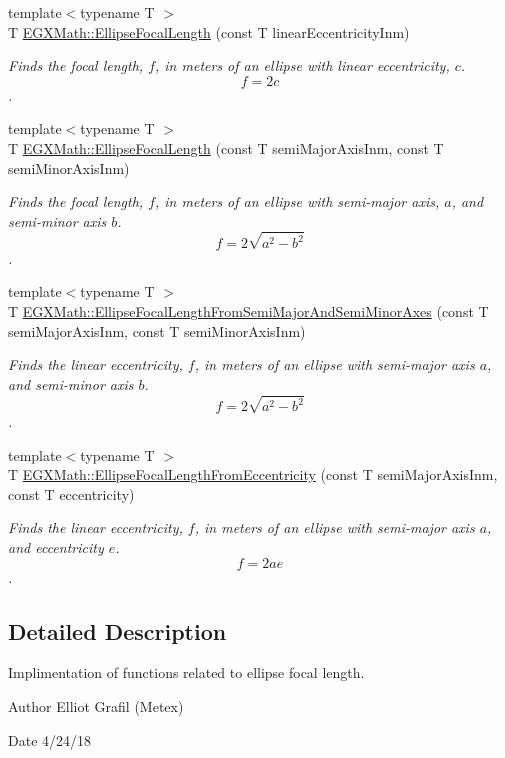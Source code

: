\begin{DoxyCompactItemize}
\item 
{\footnotesize template$<$typename T $>$ }\\T \mbox{\hyperlink{group___e_g_x_math-_geometry-2_d-_ellipse-_focal_length_gab8d63de7640c880cfecaeada6f2afdac}{E\+G\+X\+Math\+::\+Ellipse\+Focal\+Length}} (const T linear\+Eccentricity\+Inm)
\begin{DoxyCompactList}\small\item\em Finds the focal length, $f$, in meters of an ellipse with linear eccentricity, $c$. \[ f = 2c \]. \end{DoxyCompactList}\item 
{\footnotesize template$<$typename T $>$ }\\T \mbox{\hyperlink{group___e_g_x_math-_geometry-2_d-_ellipse-_focal_length_ga7baefbac49ec6871a8db621ee0591674}{E\+G\+X\+Math\+::\+Ellipse\+Focal\+Length}} (const T semi\+Major\+Axis\+Inm, const T semi\+Minor\+Axis\+Inm)
\begin{DoxyCompactList}\small\item\em Finds the focal length, $f$, in meters of an ellipse with semi-\/major axis, $a$, and semi-\/minor axis $b$. \[ f=2\sqrt{a^2-b^2} \]. \end{DoxyCompactList}\item 
{\footnotesize template$<$typename T $>$ }\\T \mbox{\hyperlink{group___e_g_x_math-_geometry-2_d-_ellipse-_focal_length_ga87a2be49f9539b12f1a5b546e3c6a643}{E\+G\+X\+Math\+::\+Ellipse\+Focal\+Length\+From\+Semi\+Major\+And\+Semi\+Minor\+Axes}} (const T semi\+Major\+Axis\+Inm, const T semi\+Minor\+Axis\+Inm)
\begin{DoxyCompactList}\small\item\em Finds the linear eccentricity, $f$, in meters of an ellipse with semi-\/major axis $a$, and semi-\/minor axis $b$. \[ f=2\sqrt{a^2-b^2} \]. \end{DoxyCompactList}\item 
{\footnotesize template$<$typename T $>$ }\\T \mbox{\hyperlink{group___e_g_x_math-_geometry-2_d-_ellipse-_focal_length_ga08a781f716a2e14f230fe094ecf5b03c}{E\+G\+X\+Math\+::\+Ellipse\+Focal\+Length\+From\+Eccentricity}} (const T semi\+Major\+Axis\+Inm, const T eccentricity)
\begin{DoxyCompactList}\small\item\em Finds the linear eccentricity, $f$, in meters of an ellipse with semi-\/major axis $a$, and eccentricity $e$. \[ f=2 a e \]. \end{DoxyCompactList}\end{DoxyCompactItemize}


\subsection{Detailed Description}
Implimentation of functions related to ellipse focal length. 

\begin{DoxyAuthor}{Author}
Elliot Grafil (Metex) 
\end{DoxyAuthor}
\begin{DoxyDate}{Date}
4/24/18 
\end{DoxyDate}
